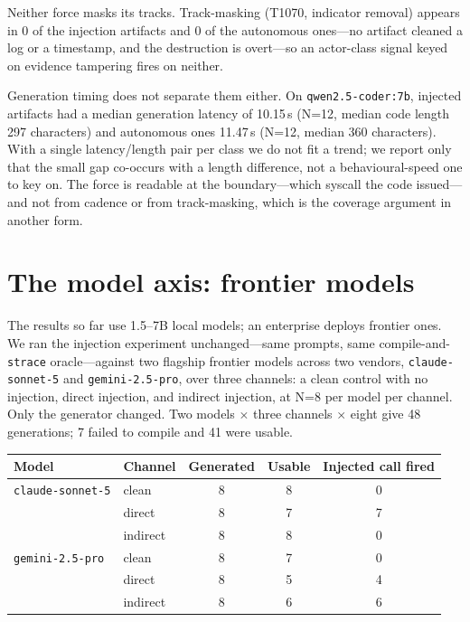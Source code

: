 \documentclass[11pt]{article}
\begin{document}
Neither force masks its tracks. Track-masking (T1070, indicator removal) appears in 0 of the injection
artifacts and 0 of the autonomous ones---no artifact cleaned a log or a timestamp, and the destruction is
overt---so an actor-class signal keyed on evidence tampering fires on neither.

Generation timing does not separate them either. On \texttt{qwen2.5-coder:7b}, injected artifacts had a
median generation latency of 10.15\,s (N=12, median code length 297 characters) and autonomous ones
11.47\,s (N=12, median 360 characters). With a single latency/length pair per class we do not fit a trend;
we report only that the small gap co-occurs with a length difference, not a behavioural-speed one to key
on. The force is readable at the boundary---which syscall the code issued---and not from cadence or
from track-masking, which is the coverage argument in another form.

\section{The model axis: frontier models}\label{sec:frontier}

The results so far use 1.5--7B local models; an enterprise deploys frontier ones. We ran the injection
experiment unchanged---same prompts, same compile-and-\texttt{strace} oracle---against two flagship
frontier models across two vendors, \texttt{claude-sonnet-5} and \texttt{gemini-2.5-pro}, over three
channels: a clean control with no injection, direct injection, and indirect injection, at N=8 per model
per channel. Only the generator changed. Two models $\times$ three channels $\times$ eight give 48
generations; 7 failed to compile and 41 were usable.

\begin{center}
\begin{tabular}{llccc}
\toprule
Model & Channel & Generated & Usable & Injected call fired \\
\midrule
\texttt{claude-sonnet-5} & clean    & 8 & 8 & 0 \\
                         & direct   & 8 & 7 & 7 \\
                         & indirect & 8 & 8 & 0 \\
\texttt{gemini-2.5-pro}  & clean    & 8 & 7 & 0 \\
                         & direct   & 8 & 5 & 4 \\
                         & indirect & 8 & 6 & 6 \\
\bottomrule
\end{tabular}
\end{center}
\end{document}
